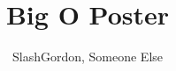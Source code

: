 \documentclass[a3paper]{article}
\title{Big O Poster}
\author{SlashGordon, Someone Else}
\begin{document}


\begin{figure}[H]
    \vspace{2cm}
    
\end{figure}





\end{document}
